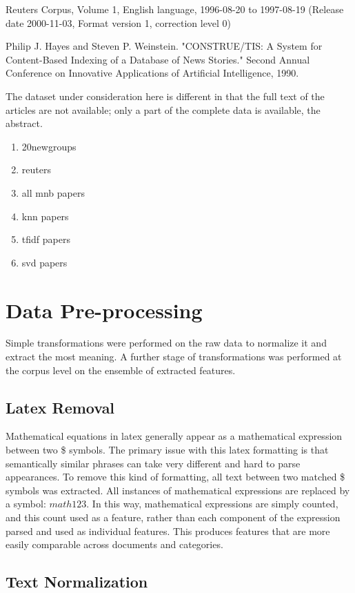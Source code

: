 \documentclass[10pt,twocolumn]{article}
\begin{document}
Reuters Corpus, Volume 1, English language, 1996-08-20 to 1997-08-19
(Release date 2000-11-03, Format version 1, correction level 0)

Philip J. Hayes and Steven P. Weinstein. "CONSTRUE/TIS: A System for Content-Based Indexing of a Database of News Stories." Second Annual Conference on Innovative Applications of Artificial Intelligence, 1990. 

The dataset under consideration here is different in that the full text of the articles are not available; only a part of the complete data is available, the abstract.

\begin {enumerate}
\item 20newgroups
\item reuters
\item all mnb papers
\item knn papers
\item tfidf papers
\item svd papers
\end {enumerate}

\section*{Data Pre-processing}

Simple transformations were performed on the raw data to normalize it and extract the most meaning. A further stage of transformations was performed at the corpus level on the ensemble of extracted features.

\subsection*{Latex Removal}

Mathematical equations in latex generally appear as a mathematical expression between two \$ symbols. The primary issue with this latex formatting is that semantically similar phrases can take very different and hard to parse appearances. To remove this kind of formatting, all text between two matched \$ symbols was extracted. All instances of mathematical expressions are replaced by a symbol: $math123$. In this way, mathematical expressions are simply counted, and this count used as a feature, rather than each component of the expression parsed and used as individual features.  This produces features that are more easily comparable across documents and categories.

\subsection*{Text Normalization}
\end{document}
